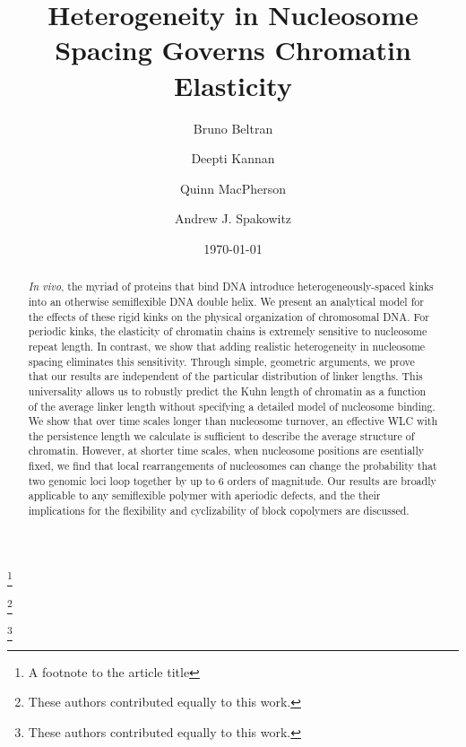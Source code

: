 \documentclass[%
 reprint,
superscriptaddress,
showpacs,preprintnumbers,
 amsmath,amssymb,
 aps,
 prl,
]{revtex4-1}
\begin{document}
\title{Heterogeneity in Nucleosome Spacing Governs Chromatin Elasticity}%
\thanks{A footnote to the article title}%

\author{Bruno Beltran}
\thanks{These authors contributed equally to this work.}%
%
\author{Deepti Kannan}%
\thanks{These authors contributed equally to this work.}%
\author{Quinn MacPherson}%
%
\author{Andrew J. Spakowitz}%
%
%
%
%
\date{\today}%

\begin{abstract}
\textit{In vivo}, the myriad of proteins that bind DNA introduce heterogeneously-spaced
    kinks into an otherwise semiflexible DNA double helix.
We present an analytical model for the effects of these rigid kinks on the
    physical organization of chromosomal DNA\@.
For periodic kinks, the elasticity of chromatin chains is extremely sensitive to
    nucleosome repeat length.
In contrast, we show that adding realistic heterogeneity in nucleosome spacing
    eliminates this sensitivity. Through simple, geometric arguments, we prove
    that our results are independent of the
    particular distribution of linker lengths. This universality allows us to
    robustly predict the Kuhn length of chromatin as a function of the average
    linker length without specifying a detailed model of nucleosome binding.
We show that over time scales longer than nucleosome turnover, an effective WLC with the persistence length we
    calculate is sufficient to describe the average structure of chromatin.
However, at shorter time scales, when nucleosome positions are esentially
    fixed, we find that local rearrangements of nucleosomes can change the probability that two genomic
    loci loop together by up to 6 orders of magnitude.
Our results are broadly applicable to any semiflexible polymer with aperiodic
    defects, and the their implications for the flexibility and cyclizability of
    block copolymers are discussed.
\end{abstract}
\end{document}
